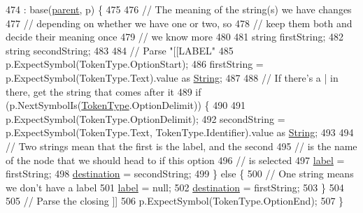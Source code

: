 \begin{DoxyCode}
474                                                                  : base(\hyperlink{a00063_af313a82103fcc2ff5a177dbb06b92f7b}{parent}, p) \{
475 
476                 \textcolor{comment}{// The meaning of the string(s) we have changes}
477                 \textcolor{comment}{// depending on whether we have one or two, so}
478                 \textcolor{comment}{// keep them both and decide their meaning once}
479                 \textcolor{comment}{// we know more}
480 
481                 \textcolor{keywordtype}{string} firstString;
482                 \textcolor{keywordtype}{string} secondString;
483 
484                 \textcolor{comment}{// Parse "[[LABEL"}
485                 p.ExpectSymbol(TokenType.OptionStart);
486                 firstString = p.ExpectSymbol(TokenType.Text).value as \hyperlink{a00026_a301aa7c866593a5b625a8fc158bbeacea27118326006d3829667a400ad23d5d98}{String};
487 
488                 \textcolor{comment}{// If there's a | in there, get the string that comes after it}
489                 \textcolor{keywordflow}{if} (p.NextSymbolIs(\hyperlink{a00026_a301aa7c866593a5b625a8fc158bbeace}{TokenType}.OptionDelimit)) \{
490 
491                     p.ExpectSymbol(TokenType.OptionDelimit);
492                     secondString = p.ExpectSymbol(TokenType.Text, TokenType.Identifier).value as 
      \hyperlink{a00026_a301aa7c866593a5b625a8fc158bbeacea27118326006d3829667a400ad23d5d98}{String};
493 
494                     \textcolor{comment}{// Two strings mean that the first is the label, and the second}
495                     \textcolor{comment}{// is the name of the node that we should head to if this option}
496                     \textcolor{comment}{// is selected}
497                     \hyperlink{a00061_a7f27d78e67fed6992767e995e70fc468}{label} = firstString;
498                     \hyperlink{a00061_abbe56fba06169901508e6c659f06c236}{destination} = secondString;
499                 \} \textcolor{keywordflow}{else} \{
500                     \textcolor{comment}{// One string means we don't have a label}
501                     \hyperlink{a00061_a7f27d78e67fed6992767e995e70fc468}{label} = null;
502                     \hyperlink{a00061_abbe56fba06169901508e6c659f06c236}{destination} = firstString;
503                 \}
504 
505                 \textcolor{comment}{// Parse the closing ]]}
506                 p.ExpectSymbol(TokenType.OptionEnd);
507             \}
\end{DoxyCode}


